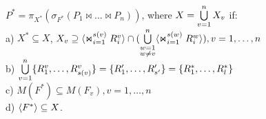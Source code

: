 \begin{theorem}
$P^{\ast} =  \pi_{X^{\ast}} ( \sigma_{F^{\ast}} (P_1 \Join \dots \Join
P_n))$, where $X = \bigcup\limits_{v=1}^{n} X_{v}$ if:
\\a) $X^{\ast} \subseteq X$, $X_v \supseteq \<\Join_{i=1}^{s(v)} R^v_i> \cap (\bigcup\limits_{\substack{w=1\\ w \neq v}}^{n} \<\Join_{i=1}^{s(w)} R^w_i> ), v = 1,\dots,n$
\\b)
$ \bigcup\limits_{v=1}^{n} \{R^{v}_{1}, \ldots, R^{v}_{s(v)}\} = \{R'_{1}, \ldots, R'_{s'}\}
= \{R^{\ast}_{1}, \ldots, R^{\ast}_{l}\} $
\\c) $M(F^{\ast}) \subseteq M(F_{v}), v = 1,\dots,n $
\\d) $ \<F^{\ast}> \subseteq X $.
\label{th_mult_eq}
\end{theorem}
